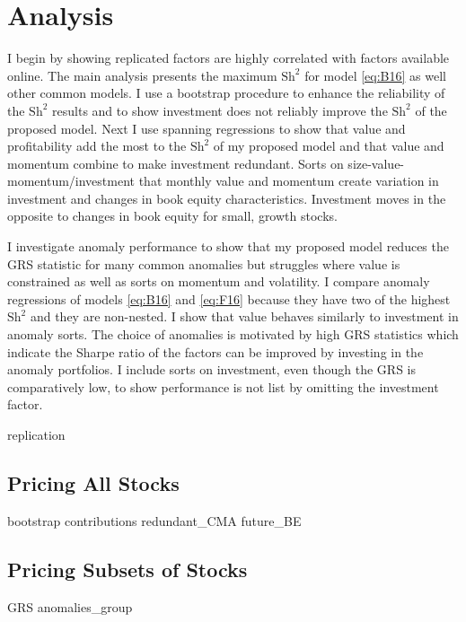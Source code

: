 
\section*{Analysis}

I begin by showing replicated factors are highly correlated with factors
available online. The main analysis presents the maximum $\text{Sh}^2$ for
model \ref{eq:B16} as well other common models. I use a bootstrap procedure to
enhance the reliability of the $\text{Sh}^2$ results and to show investment
does not reliably improve the $\text{Sh}^2$ of the proposed model. Next I use
spanning regressions to show that value and profitability add the most to the
$\text{Sh}^2$ of my proposed model and that value and momentum combine to make
investment redundant. Sorts on size-value- momentum/investment that monthly
value and momentum create variation in investment and changes in book equity
characteristics. Investment moves in the opposite to changes in book equity for
small, growth stocks.

I investigate anomaly performance to show that my proposed model reduces the
GRS statistic for many common anomalies but struggles where value is
constrained as well as sorts on momentum and volatility. I compare anomaly
regressions of models \ref{eq:B16} and \ref{eq:F16} because they have two of
the highest $\text{Sh}^2$ and they are non-nested. I show that value behaves
similarly to investment in anomaly sorts. The choice of anomalies is motivated
by high GRS statistics which indicate the Sharpe ratio of the factors can be
improved by investing in the anomaly portfolios. I include sorts on investment,
even though the GRS is comparatively low, to show performance is not list by
omitting the investment factor.

{replication}

\subsection*{Pricing All Stocks}

{bootstrap}
{contributions}
{redundant_CMA}
{future_BE}

\subsection*{Pricing Subsets of Stocks}

{GRS}
{anomalies_group}

